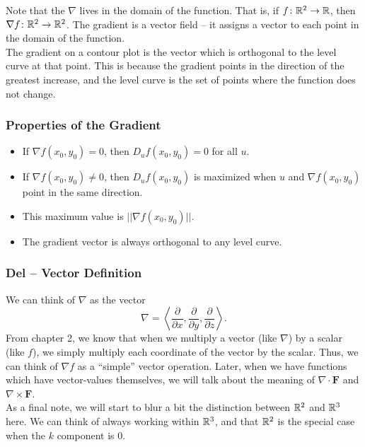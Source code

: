 Note that the \(\nabla\) lives in the domain of the function. That is, if \(f \colon \mathbb{R}^{2} \to \mathbb{R}\), then \(\nabla f \colon \mathbb{R}^{2} \to \mathbb{R}^{2}\). The gradient is a vector field – it assigns a vector to each point in the domain of the function. \\

The gradient on a contour plot is the vector which is orthogonal to the level curve at that point. This is because the gradient points in the direction of the greatest increase, and the level curve is the set of points where the function does not change.

\subsubsection{Properties of the Gradient}

\begin{itemize}
    \item If \(\nabla f(x_{0}, y_{0}) = 0\), then \(D_{u}f(x_{0}, y_{0}) = 0\) for all \(u\).
    \item If \(\nabla f(x_{0}, y_{0}) \neq 0\), then \(D_{u}f(x_{0}, y_{0})\) is maximized when \(u\) and \(\nabla f(x_{0}, y_{0})\) point in the same direction.
    \item This maximum value is \(||\nabla f(x_{0}, y_{0})||\).
    \item The gradient vector is always orthogonal to any level curve.
\end{itemize}

\subsubsection{Del – Vector Definition}

We can think of \(\nabla\) as the vector
\[
\nabla = \left\langle \dfrac{\partial}{\partial x}, \dfrac{\partial}{\partial y}, \dfrac{\partial}{\partial z} \right\rangle.
\]
From chapter 2, we know that when we multiply a vector (like \(\nabla\)) by a scalar (like \(f\)), we simply multiply each coordinate of the vector by the scalar. Thus, we can think of \(\nabla f\) as a “simple” vector operation. Later, when we have functions which have vector-values themselves, we will talk about the meaning of \(\nabla \cdot \mathbf{F}\) and \(\nabla \times \mathbf{F}\). \\ 

As a final note, we will start to blur a bit the distinction between \(\mathbb{R}^{2}\) and \(\mathbb{R}^{3}\) here. We can think of always working within \(\mathbb{R}^{3}\), and that \(\mathbb{R}^{2}\) is the special case when the \(k\) component is 0.

